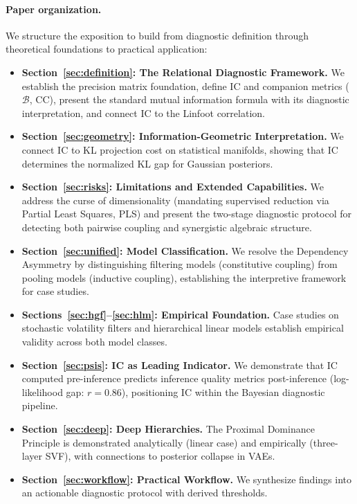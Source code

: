 \documentclass[10pt]{article} %
\theoremstyle{plain}
\theoremstyle{definition}
\newcommand{\BB}{\mathcal{B}}  %
\newcommand{\CC}{\mathrm{CC}}  %
\begin{document}
\paragraph{Paper organization.} We structure the exposition to build from diagnostic definition through theoretical foundations to practical application:
\begin{itemize}
    \item \textbf{Section~\ref{sec:definition}: The Relational Diagnostic Framework.} We establish the precision matrix foundation, define IC and companion metrics ($\BB$, $\CC$), present the standard mutual information formula with its diagnostic interpretation, and connect IC to the Linfoot correlation.
    \item \textbf{Section~\ref{sec:geometry}: Information-Geometric Interpretation.} We connect IC to KL projection cost on statistical manifolds, showing that IC determines the normalized KL gap for Gaussian posteriors.
    \item \textbf{Section~\ref{sec:risks}: Limitations and Extended Capabilities.} We address the curse of dimensionality (mandating supervised reduction via Partial Least Squares, PLS) and present the two-stage diagnostic protocol for detecting both pairwise coupling and synergistic algebraic structure.
    \item \textbf{Section~\ref{sec:unified}: Model Classification.} We resolve the Dependency Asymmetry by distinguishing filtering models (constitutive coupling) from pooling models (inductive coupling), establishing the interpretive framework for case studies.
    \item \textbf{Sections~\ref{sec:hgf}--\ref{sec:hlm}: Empirical Foundation.} Case studies on stochastic volatility filters and hierarchical linear models establish empirical validity across both model classes.
    \item \textbf{Section~\ref{sec:psis}: IC as Leading Indicator.} We demonstrate that IC computed pre-inference predicts inference quality metrics post-inference (log-likelihood gap: $r = 0.86$), positioning IC within the Bayesian diagnostic pipeline.
    \item \textbf{Section~\ref{sec:deep}: Deep Hierarchies.} The Proximal Dominance Principle is demonstrated analytically (linear case) and empirically (three-layer SVF), with connections to posterior collapse in VAEs.
    \item \textbf{Section~\ref{sec:workflow}: Practical Workflow.} We synthesize findings into an actionable diagnostic protocol with derived thresholds.
\end{itemize}
\end{document}
